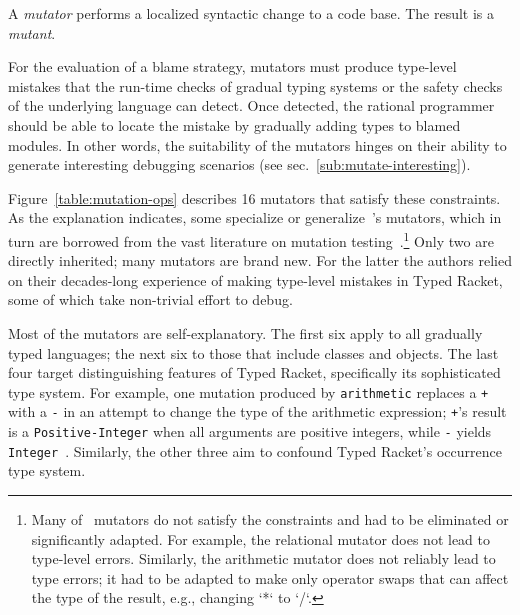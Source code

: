 
A {\it mutator\/} performs a localized syntactic change to a code base. The
result is a {\em mutant\/}.

For the evaluation of a blame strategy, mutators must produce type-level
mistakes that the run-time checks of gradual typing systems or the safety
checks of the underlying language can detect. Once detected, the rational
programmer should be able to locate the mistake by gradually adding types
to blamed modules. In other words, the suitability of the mutators hinges
on their ability to generate interesting debugging scenarios (see
sec.~\ref{sub:mutate-interesting}).


Figure~\ref{table:mutation-ops} describes 16 mutators that satisfy these
constraints. As the explanation indicates, some specialize or
generalize~\citet{lksfd-popl-2020}'s mutators, which in turn are borrowed from
the vast literature on mutation testing~\cite{jia2011analysis}.\footnote{Many
of~\citet{lksfd-popl-2020} mutators do not satisfy the constraints and had to
be eliminated or significantly adapted. For example, the relational mutator does not lead to type-level
errors. Similarly, the arithmetic mutator does not reliably lead to type
errors; it had to be adapted to make only operator swaps that can affect the
type of the result, e.g., changing `*` to `/`.}  Only two are directly
inherited; many mutators are brand new. For the latter the authors relied on
their decades-long experience of making type-level mistakes in Typed Racket,
some of which take non-trivial effort to debug. 

Most of the mutators are self-explanatory.  The first six apply to all
gradually typed languages; the next six to those that include classes and
objects. The last four target distinguishing features of Typed Racket,
specifically its sophisticated type system. For example, one mutation produced by {\tt arithmetic}
replaces a {\tt +} with a {\tt -} in an attempt to change the type of the
arithmetic expression; {\tt +}'s result is a {\tt Positive-Integer} when all
arguments are positive integers, while {\tt -} yields {\tt
Integer}~\cite{stathff-padl-12}. Similarly, the other three aim to confound
Typed Racket's occurrence type system. 
